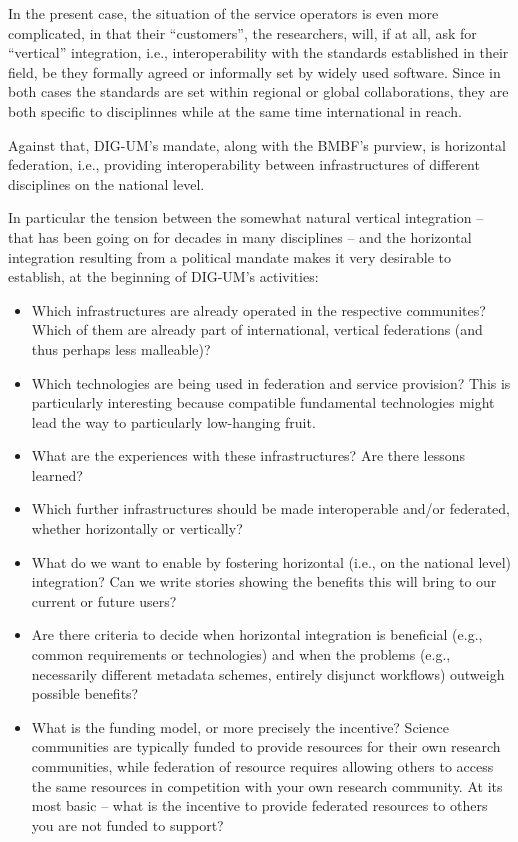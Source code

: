 \documentclass{article}
\begin{document}
In the present case, the situation of the service operators is even more
complicated, in that their ``customers'', the researchers, will, if at
all, ask for ``vertical'' integration, i.e., interoperability with
the standards established in their field, be they formally agreed or
informally set by widely used software.  Since in both cases the
standards are set within regional or global collaborations, they are
both specific to disciplinnes while at the same time international in
reach.

Against that, DIG-UM's mandate, along with the BMBF's purview, is 
horizontal federation, i.e., providing interoperability between
infrastructures of different disciplines on the national level.

In particular the tension between the somewhat natural vertical
integration -- that has been going on for decades in many disciplines --
and the horizontal integration resulting from a political mandate makes
it very desirable to establish, at the beginning of DIG-UM's activities:

\begin{itemize}
\item Which infrastructures are already operated in the
respective communites?  Which of them are already part of international,
vertical federations (and thus perhaps less malleable)?

\item Which technologies are being used in federation and service
provision?  This is particularly interesting because compatible
fundamental technologies might lead the way to particularly low-hanging
fruit.

\item What are the experiences with these infrastructures?  Are there
lessons learned?

\item Which further infrastructures should be made interoperable and/or
federated, whether horizontally or vertically?

\item What do we want to enable by fostering horizontal (i.e., on the
national level) integration?  Can we write stories showing the
benefits this will bring to our current or future users?

\item Are there criteria to decide when horizontal integration is
beneficial (e.g., common requirements or technologies) and when the
problems (e.g., necessarily different metadata schemes, entirely
disjunct workflows) outweigh possible benefits?

\item What is the funding model, or more precisely the incentive?
Science communities are typically funded to provide resources for their
own research communities, while federation of resource requires allowing
others to access the same resources in competition with your own
research community. At its most basic -- what is the incentive to
provide federated resources to others you are not funded to support?
\end{itemize}
\end{document}
